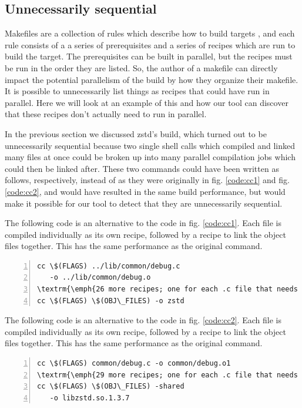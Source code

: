 \documentclass[sigconf,10pt,authorversion]{acmart}\settopmatter{printfolios=true,printccs=false,printacmref=false}
\begin{document}
\subsection{Unnecessarily sequential}
\label{sec:sequential}

Makefiles are a collection of rules which describe how to build targets \cite{gnumakemanual},
and each rule consists
of a a series of prerequisites and a series of recipes which are run to build the target.  The
prerequisites can be built in parallel, but the recipes must be run in the order they are listed.  So,
the author of a makefile can directly impact the potential parallelism of the build by
how they organize their makefile.  It is possible to unnecessarily list things as recipes that
could have run in parallel.  Here we will look at an example of this and how our tool can
discover that these recipes don't actually need to run in parallel.

In the previous section we discussed zstd's build, which turned out to be unnecessarily sequential
because two single shell calls which compiled and linked many files at once could be broken up
into many parallel compilation jobs which could then be linked after.  These two commands could
have been written as follows, respectively, instead of as they were
originally in fig. \ref{code:cc1} and fig. \ref{code:cc2}, and would have resulted in the same
build performance, but would make it possible for our tool to detect that they are unnecessarily
sequential.

The following code is an alternative to the code in fig. \ref{code:cc1}. Each file is compiled individually
as its own recipe, followed by a recipe to link the object files together.  This has the same
performance as the original command.
  \begin{Verbatim}[commandchars=\\\{\},codes={\catcode`$=3\catcode`^=7\catcode`_=8},fontsize=\small,numbers=left,xleftmargin=5mm]
cc \$(FLAGS) ../lib/common/debug.c
   -o ../lib/common/debug.o
\textrm{\emph{26 more recipes; one for each .c file that needs to be compiled}}
cc \$(FLAGS) \$(OBJ\_FILES) -o zstd
\end{Verbatim}
  
The following code is an alternative to the code in fig. \ref{code:cc2}. Each file is compiled individually
  as its own recipe, followed by a recipe to link the object files together.  This has the same
  performance as the original command.
  \begin{Verbatim}[commandchars=\\\{\},codes={\catcode`$=3\catcode`^=7\catcode`_=8},fontsize=\small,numbers=left,xleftmargin=5mm]
cc \$(FLAGS) common/debug.c -o common/debug.o1
\textrm{\emph{29 more recipes; one for each .c file that needs to be compiled}}
cc \$(FLAGS) \$(OBJ\_FILES) -shared
   -o libzstd.so.1.3.7
\end{Verbatim}
\end{document}
